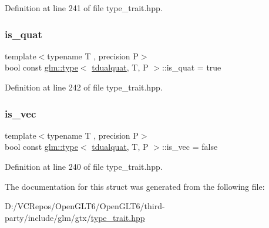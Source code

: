 Definition at line 241 of file type\+\_\+trait.\+hpp.

\mbox{\label{structglm_1_1type_3_01tdualquat_00_01_t_00_01_p_01_4_a4a599be3c9026cb94b95daf760a5edc1}} 
\subsubsection{\texorpdfstring{is\_quat}{is\_quat}}
{\footnotesize\ttfamily template$<$typename T , precision P$>$ \\
bool const \mbox{\hyperlink{structglm_1_1type}{glm\+::type}}$<$ \mbox{\hyperlink{structglm_1_1tdualquat}{tdualquat}}, T, P $>$\+::is\+\_\+quat = true\hspace{0.3cm}{\ttfamily [static]}}



Definition at line 242 of file type\+\_\+trait.\+hpp.

\mbox{\label{structglm_1_1type_3_01tdualquat_00_01_t_00_01_p_01_4_a89d63524f1e7f9f54a545c9ddd1cc8b4}} 
\subsubsection{\texorpdfstring{is\_vec}{is\_vec}}
{\footnotesize\ttfamily template$<$typename T , precision P$>$ \\
bool const \mbox{\hyperlink{structglm_1_1type}{glm\+::type}}$<$ \mbox{\hyperlink{structglm_1_1tdualquat}{tdualquat}}, T, P $>$\+::is\+\_\+vec = false\hspace{0.3cm}{\ttfamily [static]}}



Definition at line 240 of file type\+\_\+trait.\+hpp.



The documentation for this struct was generated from the following file\+:\begin{DoxyCompactItemize}
\item 
D\+:/\+V\+C\+Repos/\+Open\+G\+L\+T6/\+Open\+G\+L\+T6/third-\/party/include/glm/gtx/\mbox{\hyperlink{type__trait_8hpp}{type\+\_\+trait.\+hpp}}\end{DoxyCompactItemize}
